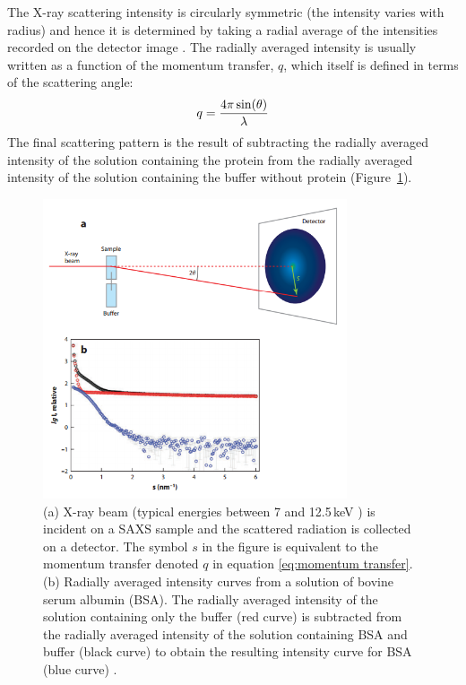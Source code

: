     The X-ray scattering intensity is circularly symmetric (the intensity varies with radius) and hence it is determined by taking a radial average of the intensities recorded on the detector image \cite{franke2015correlation}.
    The radially averaged intensity is usually written as a function of the momentum transfer, $q$, which itself is defined in terms of the scattering angle:
    \begin{equation}
        q = \frac{4 \pi \sin(\theta)}{\lambda}
        \label{eq:momentum transfer}
    \end{equation}
    The final scattering pattern is the result of subtracting the radially averaged intensity of the solution containing the protein from the radially averaged intensity of the solution containing the buffer without protein (Figure~\ref{fig:SAXS scattering curve}).
    \begin{figure}
        \centering
        \includegraphics[width=0.8\textwidth]{figures/introduction/SAXS_scattering.png}
        \caption[SAXS data collection schematic and resulting radially averaged intensity curve.]{(a) X-ray beam (typical energies between 7 and 12.5\,keV \cite{hopkins2016quantifying}) is incident on a SAXS sample and the scattered radiation is collected on a detector.
        The symbol $s$ in the figure is equivalent to the momentum transfer denoted $q$ in equation \ref{eq:momentum transfer}.
        (b) Radially averaged intensity curves from a solution of bovine serum albumin (BSA).
        The radially averaged intensity of the solution containing only the buffer (red curve) is subtracted from the radially averaged intensity of the solution containing BSA and buffer (black curve) to obtain the resulting intensity curve for BSA (blue curve) \cite{blanchet2013small}.}
        \label{fig:SAXS scattering curve}
    \end{figure}

